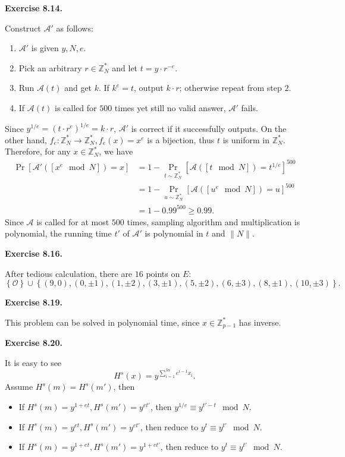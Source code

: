 \documentclass[a4paper]{article}
\newenvironment{exercise}[1]{
	\par
	\noindent\textbf{Exercise #1.}\quad
}{
	\par
	\bigskip
}
\newcommand{\pbra}[1]{\left( #1 \right)}
\newcommand{\cbra}[1]{\left\{ #1 \right\}}
\newcommand{\sbra}[1]{\left[ #1 \right]}
\newcommand{\Acal}{\mathcal{A}}
\newcommand{\Ocal}{\mathcal{O}}
\newcommand{\Zset}{\mathbb{Z}}
\begin{document}
\begin{exercise}{8.14}
    Construct $\Acal'$ as follows:
    \begin{enumerate}
        \item $\Acal'$ is given $y,N,e$.
        \item Pick an arbitrary $r\in\Zset^*_N$ and let $t=y\cdot r^{-e}$.
        \item Run $\Acal(t)$ and get $k$. If $k^e=t$, output $k\cdot r$; 
            otherwise repeat from step $2$.
        \item If $\Acal(t)$ is called for $500$ times yet still no valid answer, 
            $\Acal'$ fails.
    \end{enumerate}
    Since $y^{1/e}=(t\cdot r^{e})^{1/e}=k\cdot r$, $\Acal'$ is correct if it successfully outputs.
    On the other hand, $f_e:\Zset^*_N\to\Zset^*_N,f_e(x)=x^e$ is a bijection, thus
    $t$ is uniform in $\Zset^*_N$.
    Therefore, for any $x\in\Zset^*_N$, we have
    \begin{align*}
        \Pr\sbra{\Acal'\pbra{\sbra{x^e\mod N}}=x}&=1-\Pr_{t\sim\Zset^*_N}\sbra{\Acal\pbra{\sbra{t\mod N}}=t^{1/e}}^{500}\\
        &=1-\Pr_{u\sim\Zset^*_N}\sbra{\Acal\pbra{\sbra{u^e\mod N}}=u}^{500}\\
        &=1-0.99^{500}\geq 0.99.
    \end{align*}
    Since $\Acal$ is called for at most $500$ times, 
    sampling algorithm and multiplication is polynomial,
    the running time $t'$ of $\Acal'$ is polynomial in $t$ and $\|N\|$.
\end{exercise}

\begin{exercise}{8.16}
    After tedious calculation, there are $16$ points on $E$:
    $$
    \cbra{\Ocal}\cup\cbra{(9,0),(0,\pm 1),(1,\pm 2),(3,\pm 1),(5,\pm 2),(6,\pm 3),(8,\pm 1),(10,\pm 3)}.
    $$
\end{exercise}

\begin{exercise}{8.19}
    This problem can be solved in polynomial time, since $x\in\Zset_{p-1}^*$ has inverse.
\end{exercise}

\begin{exercise}{8.20}
    It is easy to see
    $$
    H^s(x)=y^{\sum_{i=1}^{3n}e^{i-1}x_i}.
    $$
    Assume $H^s(m)=H^s(m')$, then 
    \begin{itemize}
        \item If $H^s(m)=y^{1+et},H^s(m')=y^{et'}$, then $y^{1/e}\equiv y^{t'-t}\mod N$. 
        \item If $H^s(m)=y^{et},H^s(m')=y^{et'}$, then reduce to $y^t\equiv y^{t'}\mod N$.
        \item If $H^s(m)=y^{1+et},H^s(m')=y^{1+et'}$, then reduce to $y^t\equiv y^{t'}\mod N$.
    \end{itemize}
\end{exercise}
\end{document}
